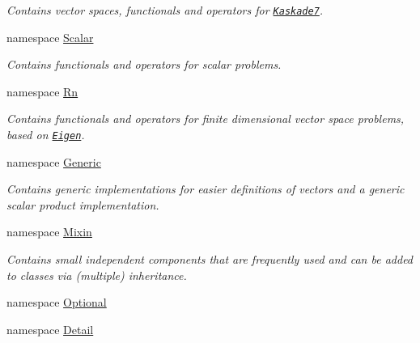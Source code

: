 \begin{DoxyCompactItemize}
\begin{DoxyCompactList}\small\item\em \-Contains vector spaces, functionals and operators for \href{http://www.zib.de/projects/kaskade7-finite-element-toolbox}{\tt \-Kaskade7}. \end{DoxyCompactList}\item 
namespace \hyperlink{namespaceSpacy_1_1Scalar}{\-Scalar}
\begin{DoxyCompactList}\small\item\em \-Contains functionals and operators for scalar problems. \end{DoxyCompactList}\item 
namespace \hyperlink{namespaceSpacy_1_1Rn}{\-Rn}
\begin{DoxyCompactList}\small\item\em \-Contains functionals and operators for finite dimensional vector space problems, based on \href{http://eigen.tuxfamily.org}{\tt \-Eigen}. \end{DoxyCompactList}\item 
namespace \hyperlink{namespaceSpacy_1_1Generic}{\-Generic}
\begin{DoxyCompactList}\small\item\em \-Contains generic implementations for easier definitions of vectors and a generic scalar product implementation. \end{DoxyCompactList}\item 
namespace \hyperlink{namespaceSpacy_1_1Mixin}{\-Mixin}
\begin{DoxyCompactList}\small\item\em \-Contains small independent components that are frequently used and can be added to classes via (multiple) inheritance. \end{DoxyCompactList}\item 
namespace \hyperlink{namespaceSpacy_1_1Optional}{\-Optional}
\item 
namespace \hyperlink{namespaceSpacy_1_1Detail}{\-Detail}
\end{DoxyCompactItemize}
